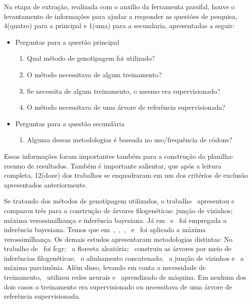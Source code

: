 \documentclass[12pt]{article}
\begin{document}
Na etapa de extração, realizada com o auxílio da ferramenta \gls{parsifal}, houve o levantamento de informações para ajudar a responder as questões de pesquisa, 4(quatro) para a principal e 1(uma) para a secundaria, apresentadas a seguir:
\begin{itemize}
    \item Perguntas para a questão principal
          \begin{enumerate}
              \item Qual método de genotipagem foi utilizado?
              \item O método necessitava de algum treinamento?
              \item Se necessita de algum treinamento, o mesmo era supervisionado?
              \item O método necessitava de uma árvore de referência supervisionada?
          \end{enumerate}
    \item Perguntas para a questão secundária
          \begin{enumerate}
              \item Alguma dessas metodologias é baseada no uso/frequência de códons?
          \end{enumerate}
\end{itemize}

Essas informações foram importantes também para a construção da planilha-resumo de resultados. Também é importante salientar, que após a leitura completa, 12(doze) dos trabalhos se enquadraram em um dos critérios de exclusão apresentados anteriormente.

Se tratando dos métodos de genotipagem utilizados, o trabalho~\cite{dimitrov_updated_2019} apresentou e comparou três para a construção de árvores filogenéticas: junção de vizinhos; máxima verossimilhança e inferência bayesiana.
Já em~\cite{yin_systematic_2019} e~\cite{bedoya-pilozo_molecular_epidemiology_2018} foi empregada a inferência bayesiana. Temos que em~\cite{fall_genetic_diversity_2021},~\cite{behl_threat_2022},~\cite{shabbir_comprehensive_2020},~\cite{hudu_hepatitis_2018} e~\cite{cho_analysis_2022} foi aplicada a máxima verossimilhança.
Os demais estudos apresentaram metodologias distintas: No trabalho de~\cite{lichtblau_alignment-free_2019} foi \gls{fcgr};~\cite{kim_ngs_2022} a floresta aleatória;~\cite{sallard_tracing_2021} construiu as árvores por meio de inferências filogenéticas;~\cite{paez-espino_diversity_evolution_2019} o alinhamento concatenado;~\cite{potdar_phylogenetic_2021} a junção de vizinhos e~\cite{tang_evolutionary_2021} a máxima parcimônia.
Além disso, levando em conta a necessidade de treinamento,~\cite{lichtblau_alignment-free_2019} utilizou redes neurais e~\cite{kim_ngs_2022} aprendizado de máquina. Em nenhum dos dois casos o treinamento era supervisionado ou necessitava de uma árvore de referência supervisionada.
\end{document}
